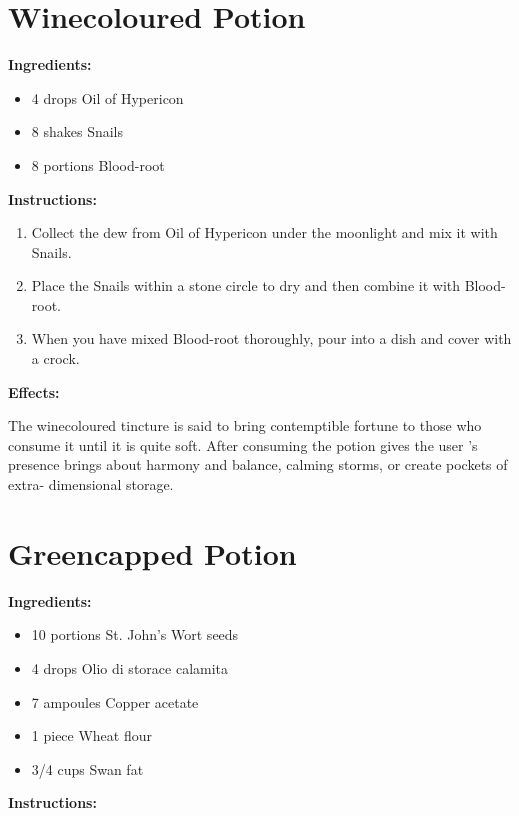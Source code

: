 \documentclass{article}
\begin{document}
\newpage
\section*{Winecoloured Potion}

\textbf{Ingredients:}

\begin{itemize}
  \item 4 drops Oil of Hypericon
  \item 8 shakes Snails
  \item 8 portions Blood-root
\end{itemize}

\textbf{Instructions:}

\begin{enumerate}
  \item Collect the dew from Oil of Hypericon under the moonlight and mix it with Snails.
  \item Place the Snails within a stone circle to dry and then combine it with Blood-root.
  \item When you have mixed Blood-root thoroughly, pour into a dish and cover with a crock.
\end{enumerate}

\textbf{Effects:}

The winecoloured tincture is said to bring contemptible fortune to those who consume it until it is quite soft. After consuming the potion gives the user 's presence brings about harmony and balance, calming storms, or create pockets of extra- dimensional storage.

\newpage
\section*{Greencapped Potion}

\textbf{Ingredients:}

\begin{itemize}
  \item 10 portions St. John's Wort seeds
  \item 4 drops Olio di storace calamita
  \item 7 ampoules Copper acetate
  \item 1 piece Wheat flour
  \item 3/4 cups Swan fat
\end{itemize}

\textbf{Instructions:}
\end{document}
